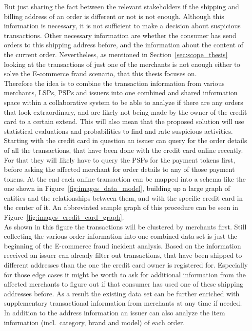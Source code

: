 But just sharing the fact between the relevant stakeholders if the shipping and billing address of an order is different or not is not enough. Although this information is necessary, it is not sufficient to make a decision about suspicious transactions. Other necessary information are whether the consumer has send orders to this shipping address before, and the information about the content of the current order. Nevertheless, as mentioned in Section~\ref{sec:scope_thesis} looking at the transactions of just one of the merchants is not enough either to solve the \gls{E-commerce} fraud scenario, that this thesis focuses on. \\

Therefore the idea is to combine the transaction information from various merchants, \gls{LSP}s, \gls{PSP}s and issuers into one combined and shared information space within a collaborative system to be able to analyze if there are any orders that look extraordinary, and are likely not being made by the owner of the credit card to a certain extend. This will also mean that the proposed solution will use statistical evaluations and probabilities to find and rate suspicious activities. Starting with the credit card in question an issuer can query for the order details of all the transactions, that have been done with the credit card online recently. For that they will likely have to query the \gls{PSP}s for the payment tokens first, before asking the affected merchant for order details to any of those payment tokens. At the end each online transaction can be mapped into a schema like the one shown in Figure~\ref{fig:images_data_model}, building up a large graph of entities and  the relationships between them, and with the specific credit card in the center of it. An abbreviated sample graph of this procedure can be seen in Figure~\ref{fig:images_credit_card_graph}. \\

As shown in this figure the transactions will be clustered by merchants first. Still collecting the various order information into one combined data set is just the beginning of the \gls{E-commerce} fraud incident analysis. Based on the information received an issuer can already filter out transactions, that have been shipped to different addresses than the one the credit card owner is registered for. Especially for those edge cases it might be worth to ask for additional information from the affected merchants to figure out if that consumer has used one of these shipping addresses before. As a result the existing data set can be further enriched with supplementary transactional information from merchants at any time if needed. In addition to the address information an issuer can also analyze the item information (incl.\ category, brand and model) of each order. \\

